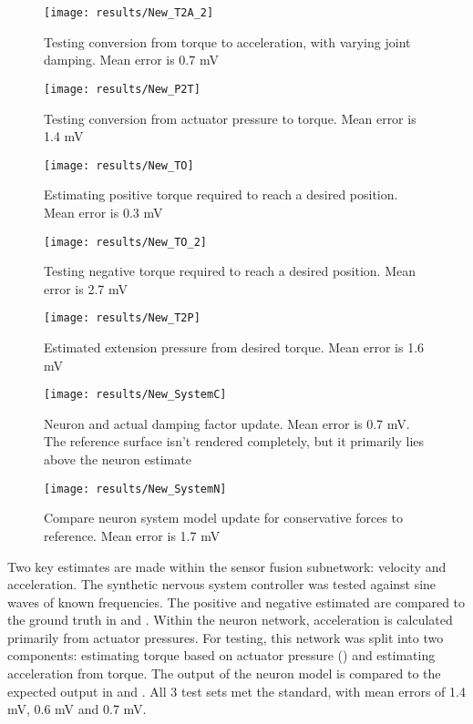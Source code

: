 \begin{figure}
\centering
\texttt{[image: results/New\_T2A\_2]}
\caption{Testing conversion from torque to acceleration, with varying joint damping. Mean error is 0.7 mV}
\label{fig:TestAccelDamping}
\end{figure}

\begin{figure}
\centering
\texttt{[image: results/New\_P2T]}
\caption{Testing conversion from actuator pressure to torque. Mean error is 1.4 mV}
\label{fig:TestP2T}
\end{figure}

\begin{figure}
\centering
\texttt{[image: results/New\_TO]}
\caption{Estimating positive torque required to reach a desired position. Mean error is 0.3 mV}
\label{fig:TestTorqueOptimizationPos}
\end{figure}

\begin{figure}
\centering
\texttt{[image: results/New\_TO\_2]}
\caption{Testing negative torque required to reach a desired position. Mean error is 2.7 mV}
\label{fig:TestTorqueOptimizationNeg}
\end{figure}

\begin{figure}
\centering
\texttt{[image: results/New\_T2P]}
\caption{Estimated extension pressure from desired torque. Mean error is 1.6 mV}
\label{fig:TestT2PPos}
\end{figure}

\begin{figure}
\centering
\texttt{[image: results/New\_SystemC]}
\caption{Neuron and actual damping factor update. Mean error is 0.7 mV. The reference surface isn't rendered completely, but it primarily lies above the neuron estimate}
\label{fig:TestSystemCPos}
\end{figure}

\begin{figure}
\centering
\texttt{[image: results/New\_SystemN]}
\caption{Compare neuron system model update for conservative forces to reference. Mean error is 1.7 mV}
\label{fig:TestSystemNPos}
\end{figure}


Two key estimates are made within the sensor fusion subnetwork: velocity and
acceleration. The synthetic nervous system controller was tested against sine waves of known
frequencies. The positive and negative estimated are compared to the ground truth in  and .
Within the neuron network, acceleration is calculated primarily from actuator
pressures. For testing, this network was split into two components: estimating
torque based on actuator pressure () and estimating acceleration from torque. The
output of the neuron model is compared to the expected output in
 and . All 3 test sets met the standard, with
mean errors of 1.4 mV, 0.6 mV and 0.7 mV.

